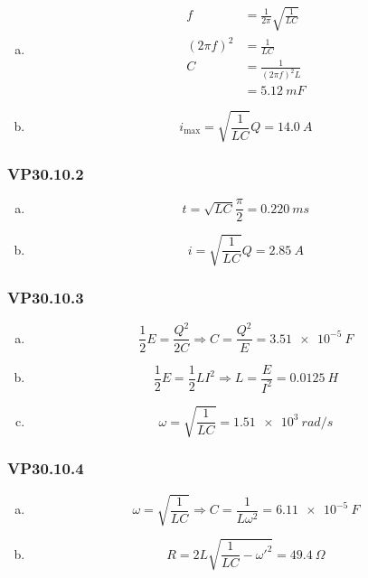 \documentclass{article}
\begin{document}
\begin{enumerate}[(a)]
  \item

        \begin{align*}
          f           & = \frac{1}{2 \pi} \sqrt{\frac{1}{L C}} \\
          (2 \pi f)^2 & = \frac{1}{L C}                        \\
          C           & = \frac{1}{(2 \pi f)^2 L}              \\
                      & = \qty{5.12}{mF}
        \end{align*}

  \item \[i_\text{max} = \sqrt{\frac{1}{L C}} Q = \qty{14.0}{A}\]
\end{enumerate}

\subsubsection{VP30.10.2}

\begin{enumerate}[(a)]
  \item \[t = \sqrt{L C} \frac{\pi}{2} = \qty{0.220}{ms}\]

  \item \[i = \sqrt{\frac{1}{L C}} Q = \qty{2.85}{A}\]
\end{enumerate}

\subsubsection{VP30.10.3}

\begin{enumerate}[(a)]
  \item \[\frac{1}{2} E = \frac{Q^2}{2 C} \Rightarrow C = \frac{Q^2}{E} = \qty{3.51e-5}{F}\]

  \item \[\frac{1}{2} E = \frac{1}{2} L I^2 \Rightarrow L = \frac{E}{I^2} = \qty{0.0125}{H}\]

  \item \[\omega = \sqrt{\frac{1}{L C}} = \qty{1.51e3}{rad/s}\]
\end{enumerate}

\subsubsection{VP30.10.4}

\begin{enumerate}[(a)]
  \item \[\omega = \sqrt{\frac{1}{L C}} \Rightarrow C = \frac{1}{L \omega^2} = \qty{6.11e-5}{F}\]

  \item \[R = 2 L \sqrt{\frac{1}{L C} - \omega'^2} = \qty{49.4}{\Omega}\]
\end{enumerate}
\end{document}
